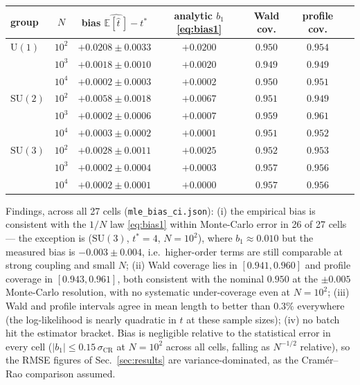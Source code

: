 \documentclass[11pt]{article}
\theoremstyle{remark}
\theoremstyle{plain}
\begin{document}
\begin{center}
\begin{tabular}{lcccccc}
\toprule
group & $N$ & bias $\widehat{\mathbb{E}[\hat t\,]} - t^*$ & analytic $b_1$ \eqref{eq:bias1} & Wald cov. & profile cov. \\
\midrule
$\mathrm{U}(1)$ & $10^2$ & $+0.0208 \pm 0.0033$ & $+0.0200$ & $0.950$ & $0.954$ \\
 & $10^3$ & $+0.0018 \pm 0.0010$ & $+0.0020$ & $0.949$ & $0.949$ \\
 & $10^4$ & $+0.0002 \pm 0.0003$ & $+0.0002$ & $0.950$ & $0.951$ \\
$\mathrm{SU}(2)$ & $10^2$ & $+0.0058 \pm 0.0018$ & $+0.0067$ & $0.951$ & $0.949$ \\
 & $10^3$ & $+0.0002 \pm 0.0006$ & $+0.0007$ & $0.959$ & $0.961$ \\
 & $10^4$ & $+0.0003 \pm 0.0002$ & $+0.0001$ & $0.951$ & $0.952$ \\
$\mathrm{SU}(3)$ & $10^2$ & $+0.0028 \pm 0.0011$ & $+0.0025$ & $0.952$ & $0.953$ \\
 & $10^3$ & $+0.0002 \pm 0.0004$ & $+0.0003$ & $0.957$ & $0.956$ \\
 & $10^4$ & $+0.0002 \pm 0.0001$ & $+0.0000$ & $0.957$ & $0.956$ \\
\bottomrule
\end{tabular}
\end{center}

Findings, across all 27 cells (\texttt{mle\_bias\_ci.json}): (i) the empirical bias is consistent with the $1/N$ law \eqref{eq:bias1} within Monte-Carlo error in 26 of 27 cells --- the exception is ($\mathrm{SU}(3)$, $t^* = 4$, $N = 10^2$), where $b_1 \approx 0.010$ but the measured bias is $-0.003 \pm 0.004$, i.e.\ higher-order terms are still comparable at strong coupling and small $N$; (ii) Wald coverage lies in $[0.941, 0.960]$ and profile coverage in $[0.943, 0.961]$, both consistent with the nominal $0.950$ at the $\pm 0.005$ Monte-Carlo resolution, with no systematic under-coverage even at $N = 10^2$; (iii) Wald and profile intervals agree in mean length to better than $0.3\%$ everywhere (the log-likelihood is nearly quadratic in $t$ at these sample sizes); (iv) no batch hit the estimator bracket. Bias is negligible relative to the statistical error in every cell ($|b_1| \leq 0.15\,\sigma_{\mathrm{CR}}$ at $N = 10^2$ across all cells, falling as $N^{-1/2}$ relative), so the RMSE figures of Sec.~\ref{sec:results} are variance-dominated, as the Cram\'er--Rao comparison assumed.
\end{document}
